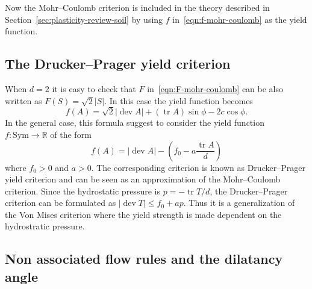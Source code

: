 \documentclass[a4paper,10pt,twoside]{amsbook}
\numberwithin{section}{chapter}
\numberwithin{equation}{chapter}
\theoremstyle{definition}
\DeclareMathOperator{\dev}{dev}
\DeclareMathOperator{\tr}{tr}
\begin{document}
Now the Mohr--Coulomb criterion is included in the theory described in Section~\ref{sec:plasticity-review-soil} by using $f$ in~\eqref{eqn:f-mohr-coulomb} as the yield function.

\subsection{The Drucker--Prager yield criterion}

When $d=2$ it is easy to check that $F$ in~\eqref{eqn:F-mohr-coulomb} can be also written as $F(S)=\sqrt{2}|S|$. In this case the yield function becomes
\begin{equation}
\label{eqn:f-mohr-coulomb-2d}
f(A)=\sqrt{2}|\dev A|+(\tr A)\sin\phi-2c\cos\phi.
\end{equation}
In the general case, this formula suggest to consider the yield function $f\colon\text{Sym}\to\mathbb{R}$ of the form
\begin{equation}
\label{eqn:f}
f(A)=|\dev A|-\left(f_0-a\frac{\tr A}{d}\right)
\end{equation}
where $f_0>0$ and $a>0$. The corresponding criterion is known as Drucker--Prager yield criterion and can be seen as an approximation of the Mohr--Coulomb criterion. Since the hydrostatic pressure is $p=-\tr T/d$, the Drucker--Prager criterion can be formulated as $|\dev T|\le f_0+ap$. Thus it is a generalization of the Von Mises criterion where the yield strength is made dependent on the hydrostratic pressure.

\subsection{Non associated flow rules and the dilatancy angle}
\end{document}

